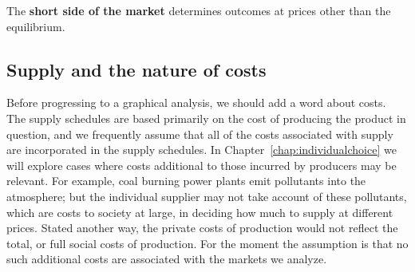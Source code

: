 \begin{DefBox}
The \textbf{short side of the market} determines outcomes at prices other than the equilibrium.
\end{DefBox}

\subsection*{Supply and the nature of costs}

Before progressing to a graphical analysis, we should add a word about costs. The supply schedules are based primarily on the cost of producing the product in question, and we frequently assume that all of the costs associated with supply are incorporated in the supply schedules. In Chapter~\ref{chap:individualchoice} we will explore cases where costs additional to those incurred by producers may be relevant. For example, coal burning power plants emit pollutants into the atmosphere; but the individual supplier may not take account of these pollutants, which are costs to society at large, in deciding how much to supply at different prices. Stated another way, the private costs of production would not reflect the total, or full social costs of production. For the moment the assumption is that no such additional costs are associated with the markets we analyze.